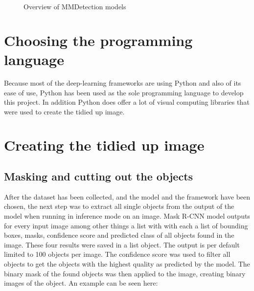 \begin{figure}[H]
	\caption{\label{fig:mmdetection-models} Overview of MMDetection models}
\end{figure}

\section{Choosing the programming language}

Because most of the deep-learning frameworks are using Python and also of its ease of use, Python has been used as the sole programming language to develop this project. In addition Python does offer a lot of visual computing libraries that were used to create the tidied up image.

\section{Creating the tidied up image}

\subsection{Masking and cutting out the objects}

After the dataset has been collected, and the model and the framework have been chosen, the next step was to extract all single objects from the output of the model when running in inference mode on an image. Mask R-CNN model outputs for every input image among other things a list with with each a list of bounding boxes, masks, confidence score and predicted class of all objects found in the image. These four results were saved in a list object. The output is per default limited to 100 objects per image. The confidence score was used to filter all objects to get the objects with the highest quality as predicted by the model. The binary mask of the found objects was then applied to the image, creating binary images of the object. An example can be seen here:

